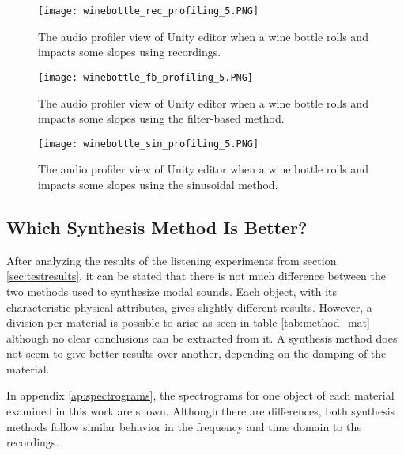 \begin{figure}[H]
  \centering
    \texttt{[image: winebottle\_rec\_profiling\_5.PNG]}
      \caption{The audio profiler view of Unity\textsuperscript{\textregistered} editor when a wine bottle rolls and impacts some slopes using recordings.}
      \label{fig:recordprofiler}
\end{figure}

\begin{figure}[H]
  \centering
    \texttt{[image: winebottle\_fb\_profiling\_5.PNG]}
      \caption{The audio profiler view of Unity\textsuperscript{\textregistered} editor when a wine bottle rolls and impacts some slopes using the filter-based method.}
      \label{fig:fbprofiler}
\end{figure}

\begin{figure}[H]
  \centering
    \texttt{[image: winebottle\_sin\_profiling\_5.PNG]}
      \caption{The audio profiler view of Unity\textsuperscript{\textregistered} editor when a wine bottle rolls and impacts some slopes using the sinusoidal method.}
      \label{fig:sinprofiler}
\end{figure}


\subsection{Which Synthesis Method Is Better?}
After analyzing the results of the listening experiments from section \ref{sec:testresults}, it can be stated that there is not much difference between the two methods used to synthesize modal sounds. Each object, with its characteristic physical attributes, gives slightly different results. However, a division per material is possible to arise as seen in table \ref{tab:method_mat} although no clear conclusions can be extracted from it. A synthesis method does not seem to give better results over another, depending on the damping of the material.

In appendix \ref{ap:spectrograms}, the spectrograms for one object of each material examined in this work are shown. Although there are differences, both synthesis methods follow similar behavior in the frequency and time domain to the recordings.

